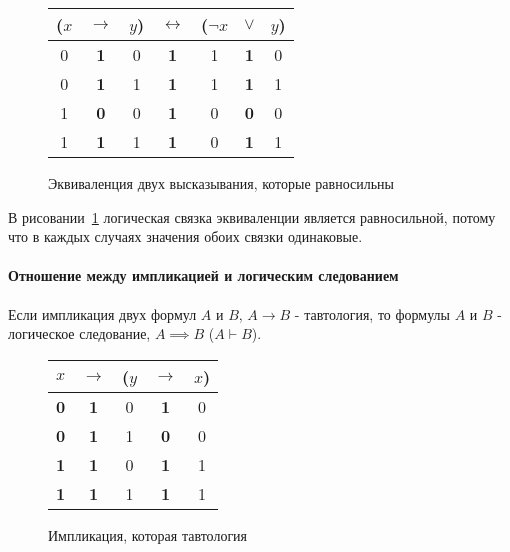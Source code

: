 \documentclass[fleqn,11pt]{article}
\theoremstyle{definition}
\begin{document}
\begin{figure}[h]
	\begin{center}
		\begin{tabular}{|ccc|c|ccc|} \hline
			($x$ & $\rightarrow$ & $y$) & $\leftrightarrow$ & ($\neg x$ & $\lor$ & $y$) \\ \hline
			0 & \textbf{1} & 0 & \textbf{1} & 1 & \textbf{1} & 0 \\
			0 & \textbf{1} & 1 & \textbf{1} & 1 & \textbf{1} & 1 \\
			1 & \textbf{0} & 0 & \textbf{1} & 0 & \textbf{0} & 0 \\
			1 & \textbf{1} & 1 & \textbf{1} & 0 & \textbf{1} & 1 \\
			\hline
		\end{tabular}
	\end{center}
	\caption{Эквиваленция двух высказывания, которые равносильны}\label{fig:biconEquiv}
\end{figure}
В рисовании~\ref{fig:biconEquiv} логическая связка эквиваленции является равносильной, потому что
в каждых случаях значения обоих связки одинаковые.
\FloatBarrier

\paragraph{Отношение между импликацией и логическим следованием}
Если импликация двух формул $A$ и $B$, $A \rightarrow B$ - тавтология, то формулы $A$ и $B$ - логическое следование,
$A \implies B$ ($A \vdash B$).

\FloatBarrier

\begin{figure}[h]
	\begin{center}
		\begin{tabular}{|c|c|ccc|} \hline
			$x$ & $\rightarrow$ & ($y$ & $\rightarrow$ & $x$) \\ \hline
			\textbf{0} & \textbf{1} & 0 & \textbf{1} & 0 \\
			\textbf{0} & \textbf{1} & 1 & \textbf{0} & 0 \\
			\textbf{1} & \textbf{1} & 0 & \textbf{1} & 1 \\
			\textbf{1} & \textbf{1} & 1 & \textbf{1} & 1 \\
			\hline
		\end{tabular}
	\end{center}
	\caption{Импликация, которая тавтология}
\end{figure}

\FloatBarrier
\end{document}
